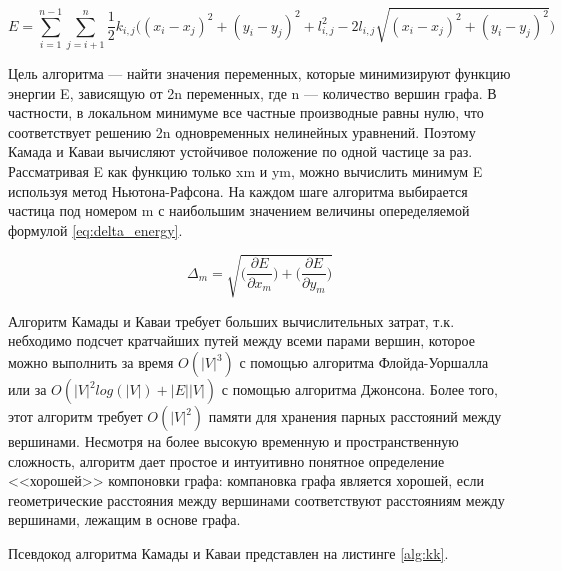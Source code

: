 \documentclass[14pt, russian]{scrartcl}
\begin{document}
\begin{equation}\label{eq:energy_extendet}
  E = \sum_{i = 1}^{n - 1}\sum_{j = i + 1}^{n}{\frac{1}{2}k_{i, j}\bigg( (x_i - x_j)^2 + (y_i - y_j)^2 + l^2_{i, j} - 2 l_{i, j}\sqrt{(x_i - x_j)^2 + (y_i - y_j)^2} \bigg)}
\end{equation} 


Цель алгоритма --- найти значения переменных, которые минимизируют функцию энергии E, зависящую от 2n переменных, где n --- количество вершин графа. В частности, в локальном минимуме все частные производные равны нулю, что соответствует решению 2n одновременных нелинейных уравнений. Поэтому Камада и Каваи вычисляют устойчивое положение по одной частице за раз. Рассматривая E как функцию только xm и ym, можно вычислить минимум E используя метод Ньютона-Рафсона. На каждом шаге алгоритма выбирается частица под номером m с наибольшим значением величины опеределяемой формулой \ref{eq:delta_energy}.

\begin{equation}\label{eq:delta_energy}
  \Delta_m = \sqrt{\bigg( \frac{\partial E}{\partial x_m} \bigg) + \bigg(  \frac{\partial E}{\partial y_m} \bigg)}
\end{equation} 

Алгоритм Камады и Каваи требует больших вычислительных затрат, т.к. небходимо подсчет кратчайших путей между всеми парами вершин, которое можно выполнить за время $O(|V|^3)$ с помощью алгоритма Флойда-Уоршалла или за $O(|V|^2 log(|V|)  + |E||V|)$ с помощью алгоритма Джонсона. Более того, этот алгоритм требует $O(|V|^2)$ памяти для хранения парных расстояний между вершинами. Несмотря на более высокую временную и пространственную сложность, алгоритм дает простое и интуитивно понятное определение <<хорошей>>
компоновки графа: компановка графа является хорошей, если геометрические расстояния между вершинами соответствуют расстояниям между вершинами, лежащим в основе графа.

Псевдокод алгоритма Камады и Каваи представлен на листинге \ref{alg:kk}.
\end{document}
